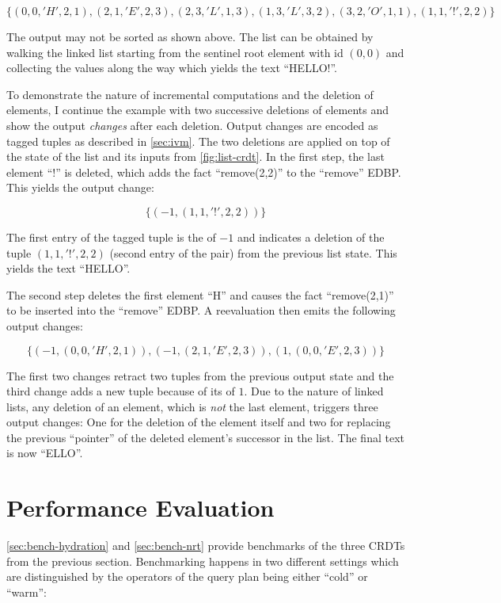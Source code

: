 \[\{ (0,0,'H',2,1), (2,1,'E',2,3), (2,3,'L',1,3), (1,3,'L',3,2), (3,2,'O',1,1), (1,1,'!',2,2) \}\]

The output may not be sorted as shown above.
The list can be obtained by walking the linked list starting from
the sentinel root element with id \((0, 0)\) and collecting the values along
the way which yields the text ``HELLO!''.

To demonstrate the nature of incremental computations and the deletion of elements,
I continue the example with two successive deletions of elements and show
the output \emph{changes} after each deletion.
Output changes are encoded as tagged tuples as described in \ref{sec:ivm}.
The two deletions are applied on top of the state of the list and its inputs from
\ref{fig:list-crdt}.
In the first step, the last element ``!'' is deleted, which adds the fact
``remove(2,2)'' to the ``remove'' \ac{EDBP}. This yields the output change:

\[\{ (-1, (1,1,'!',2,2)) \}\]

The first entry of the tagged tuple is the \zweight{} of \(-1\) and indicates
a deletion of the tuple \((1, 1, '!', 2, 2)\) (second entry of the pair)
from the previous list state.
This yields the text ``HELLO''.

The second step deletes the first element ``H'' and causes the fact
``remove(2,1)'' to be inserted into the ``remove'' \ac{EDBP}.
A reevaluation then emits the following output changes:

\[\{
(-1, (0, 0, 'H', 2, 1)),
(-1, (2, 1, 'E', 2, 3)),
( 1, (0, 0, 'E', 2, 3))
\}\]

The first two changes retract two tuples from the previous output state and the
third change adds a new tuple because of its \zweight{} of \(1\).
Due to the nature of linked lists, any deletion of an element, which is \emph{not}
the last element, triggers three output changes: One for the deletion of the element
itself and two for replacing the previous ``pointer'' of the deleted element's
successor in the list.
The final text is now ``ELLO''.

\section{Performance Evaluation}\label{sec:benchmarks}

\ref{sec:bench-hydration} and \ref{sec:bench-nrt}
provide benchmarks of the three \acp{CRDT} from the previous section.
Benchmarking happens in two different settings which are distinguished by
the operators of the query plan being either ``cold'' or ``warm'':

